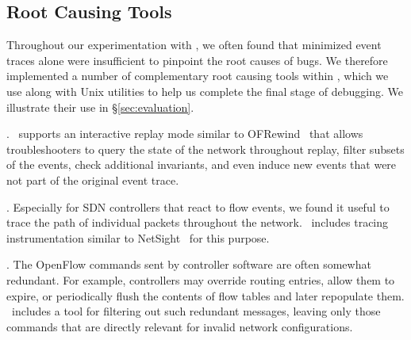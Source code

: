 
\subsection{Root Causing Tools}
\label{subsec:root_causing}

Throughout our experimentation with \projectname, we often found that
minimized event traces alone were insufficient to
pinpoint the root causes of bugs. We therefore implemented a number of
complementary root
causing tools within \projectname,
which we use along with Unix utilities to help us complete the final
stage of debugging. We illustrate their use in \S\ref{sec:evaluation}.

. \projectname~supports an interactive replay mode
similar to OFRewind~\cite{ofrewind} that allows troubleshooters to query the
state of the network throughout replay, filter subsets of the events, check
additional invariants, and
even induce new events that were not part of the original event trace.

. Especially for SDN controllers that react to
flow events, we found it useful to trace the path of individual
packets throughout the network. \projectname~includes tracing instrumentation
similar to NetSight~\cite{ndb14} for this purpose.

. The OpenFlow commands sent by controller software
are often somewhat redundant. For example, controllers may override routing
entries, allow them to expire, or periodically flush the
contents of flow tables and later repopulate them. \projectname~includes a
tool for filtering out such redundant messages,
leaving only those commands that are directly relevant for invalid network
configurations.


